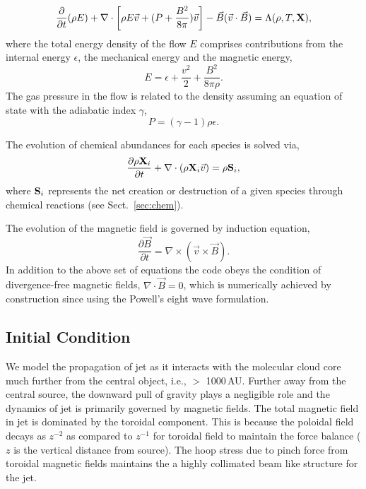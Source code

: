 \documentclass[useAMS,usenatbib,letters]{mn2e}
\begin{document}
\begin{equation}\label{encons1}
\frac{\partial}{\partial t}(\rho E)
+ \nabla \cdot\left[ \rho E \vec{v} + (P + \frac{B^2}{8\pi})\vec{v}\right]  
- \vec{B}(\vec{v}\cdot\vec{B}) = \Lambda(\rho,T,{\bf{X}}),
\end{equation}
%
%
where the total energy density of the flow $E$ comprises contributions from 
the internal energy $\epsilon$, the mechanical energy and the magnetic energy,
%
\begin{equation}\label{encons2}
 E = \epsilon + \frac{v^2}{2} + \frac{B^2}{8 \pi \rho}.
\end{equation}
The gas pressure in the flow is related to the density assuming an equation 
of state with the adiabatic index $\gamma$,
%
\begin{equation}\label{EOS}
P = (\gamma - 1) \rho \epsilon.
\end{equation}

The evolution of chemical abundances for each species is solved via,
%
\begin{equation}\label{chemevol}
\frac{\partial \rho{\bf{X}}_{i}}{\partial t} + \nabla \cdot (\rho
{\bf{X}}_{i} \vec{v})  = \rho {\bf{S}}_{i},
\end{equation}
where ${\bf{S}}_{i}$ represents the net creation or destruction of a
given species through chemical reactions (see Sect.~\ref{sec:chem}).

The evolution of the magnetic field is governed by induction equation,
%
\begin{equation}\label{induction}
\frac{\partial \vec{B}}{\partial t} = \nabla \times \left(\vec{v}\times \vec{B}\right).
\end{equation}
%
In addition to the above set of equations the code obeys the condition of divergence-free 
magnetic fields, $\nabla \cdot \vec{B} = 0$, which is numerically achieved by construction 
since using the Powell's eight wave formulation.
\subsection{Initial Condition}
We model the propagation of jet as it interacts with the molecular
cloud core much further from the central object, i.e., $>$ 1000\,AU. 
Further away from the central source, the downward pull of gravity plays a
negligible role and the dynamics of jet is primarily governed by magnetic fields.
The total magnetic field in jet is dominated by the toroidal
component. This is because the poloidal field decays as $z^{-2}$ as
compared to $z^{-1}$ for toroidal field to maintain the force balance ($z$ is the vertical distance from source). 
The hoop stress due to pinch force from toroidal magnetic fields maintains the
a highly collimated beam like structure for the jet.
%
\end{document}
